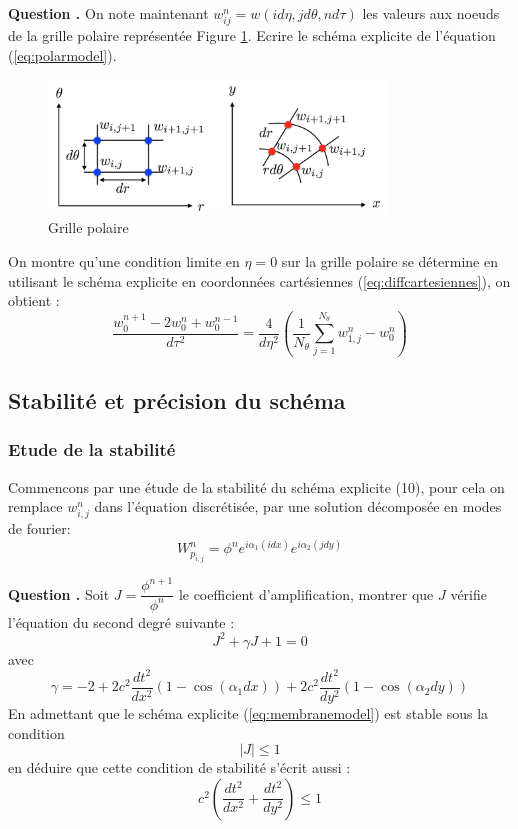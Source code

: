 \documentclass[a4,12pt]{article}
\newcounter{Nbquestion}
\newcommand*\question{%
\stepcounter{Nbquestion}%
\textbf{Question \theNbquestion. }}
\begin{document}

\begin{mdframed}[style=exampledefault]
\question On note maintenant $w_{ij}^{n}=w(id\eta,jd\theta,nd\tau)$ les valeurs aux noeuds de la grille polaire représentée Figure \ref{fig:polaire}. Ecrire le schéma explicite de l'équation (\ref{eq:polarmodel}).
\end{mdframed}


\begin{figure}
	\begin{center}
		\includegraphics[width=0.8\textwidth]{images/polaire.pdf}
		\caption{Grille polaire}
		\label{fig:polaire}
	\end{center}
\end{figure}

On montre qu'une condition limite en $\eta=0$ sur la grille polaire se détermine en utilisant le schéma explicite en coordonnées cartésiennes (\ref{eq:diffcartesiennes}), on obtient :
\[
\dfrac{w_0^{n+1}-2 w_0^{n}+ w_{0}^{n-1}}{d\tau^2}=\dfrac{4}{d \eta^2}\left(\frac{1}{N_\theta} \sum_{j=1}^{N_\theta} w_{1,j}^n-w_{0}^{n}\right)
\]

\subsection{Stabilité et précision du schéma}

\subsubsection{Etude de la stabilité}
Commencons par une étude de la stabilité du schéma explicite (10), pour cela on remplace $w_{i,j}^{n}$ dans l'équation discrétisée, par une solution décomposée en modes de fourier: 
\[
W_{p_{i,j}}^{n}=\phi^n e^{i\alpha_1(idx)}e^{i\alpha_2(jdy)}
\]


\begin{mdframed}[style=exampledefault]
\question Soit $J=\dfrac{\phi^{n+1}}{\phi^n}$ le coefficient d'amplification, montrer que $J$ vérifie l'équation du second degré suivante : 
\[
J^2+\gamma J+1=0
\]
avec 
\[
\gamma=-2+2c^2\dfrac{dt^2}{dx^2}(1-\cos(\alpha_1dx))+2c^2\dfrac{dt^2}{dy^2}(1-\cos(\alpha_2dy))
\]
En admettant que le schéma explicite (\ref{eq:membranemodel}) est stable sous la condition 
\[
\vert J \vert \leq 1
\]
en déduire que cette condition de stabilité s'écrit aussi :
\[
c^2\left(\dfrac{dt^2}{dx^2}+\dfrac{dt^2}{dy^2}\right)\leq 1
\]
\end{mdframed}
\end{document}
